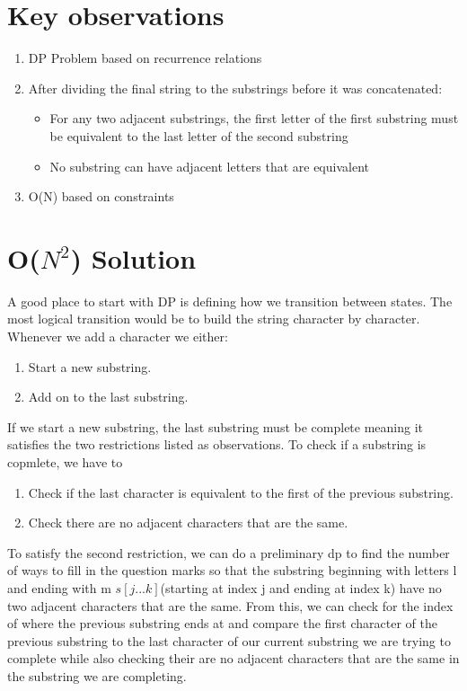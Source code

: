 \documentclass{article}
\begin{document}
\section{Key observations}
    \begin{enumerate}
    \item DP Problem based on recurrence relations
    \item After dividing the final string to the substrings before it was concatenated:
    \begin{itemize}
        \item For any two adjacent substrings, the first letter of the first substring must be equivalent to the last letter of the second substring
        \item No substring can have adjacent letters that are equivalent
    \end{itemize}
    \item O(N) based on constraints
    \end{enumerate}
\section{O($N^2$) Solution} 
    \hspace{1em} \quad A good place to start with DP is defining how we transition between states. The most logical transition would be to build the string character by character. Whenever we add a character we either:
    \begin{enumerate}
        \item Start a new substring.
        \item Add on to the last substring.
    \end{enumerate}
    If we start a new substring, the last substring must be complete meaning it satisfies the two restrictions listed as observations. To check if a substring is copmlete, we have to
    \begin{enumerate}
        \item Check if the last character is equivalent to the first of the previous substring.
        \item Check there are no adjacent characters that are the same.
    \end{enumerate}
    To satisfy the second restriction, we can do a preliminary dp to find the number of ways to fill in the question marks so that the substring beginning with letters l and ending with m $s[j...k]$(starting at index j and ending at index k) have no two adjacent characters that are the same. From this, we can check for the index of where the previous substring ends at and compare the first character of the previous substring to the last character of our current substring we are trying to complete while also checking their are no adjacent characters that are the same in the substring we are completing.
\end{document}
